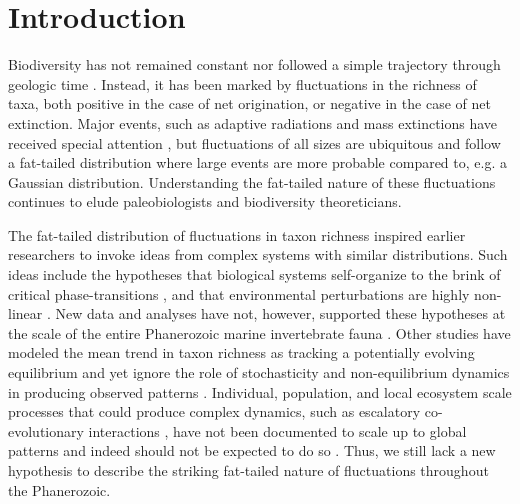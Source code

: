 \documentclass[12pt]{article}
\let\citep=\cite
\begin{document}
\section{Introduction}

Biodiversity has not remained constant nor followed a simple
trajectory through geologic time \citep{raup1982, sepkoski1984,
  gilinsky1994, liow2007, alroy08}.  Instead, it has been marked by
fluctuations in the richness of taxa, both positive in the case of net
origination, or negative in the case of net extinction. Major events,
such as adaptive radiations and mass extinctions have received special
attention \citep{benton1995, Erwin1998}, but fluctuations of all sizes
are ubiquitous \citep{sepkoski1984, alroy08, quental2013} and follow a
fat-tailed distribution where large events are more probable compared
to, e.g. a Gaussian distribution. Understanding the fat-tailed nature
of these fluctuations continues to elude paleobiologists and
biodiversity theoreticians.

The fat-tailed distribution of fluctuations in taxon richness inspired
earlier researchers to invoke ideas from complex systems with similar
distributions. Such ideas include the hypotheses that biological
systems self-organize to the brink of critical phase-transitions
\citep{bak1993, sole1997}, and that environmental perturbations are
highly non-linear \citep{newman1995}. New data and analyses have not,
however, supported these hypotheses at the scale of the entire
Phanerozoic marine invertebrate fauna \citep{kirchner1998, alroy08}.
Other studies have modeled the mean trend in taxon richness as
tracking a potentially evolving equilibrium \citep{sepkoski1984,
  alroy2010, rabosky2009ecolLett, marshall2016} and yet ignore the
role of stochasticity and non-equilibrium dynamics in producing
observed patterns \citep{erwin2012, liow2007, quental2013, harmon2015,
  jordan2016}. Individual, population, and local ecosystem scale
processes that could produce complex dynamics, such as escalatory
co-evolutionary interactions \citep{vermeij1987}, have not been
documented to scale up to global patterns \citep{madin2006} and indeed
should not be expected to do so \citep{vermeij2008}.  Thus, we still
lack a new hypothesis to describe the striking fat-tailed nature of
fluctuations throughout the Phanerozoic.
\end{document}
